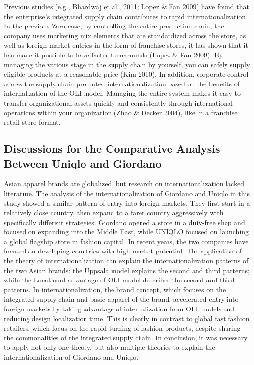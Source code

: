 \documentclass[12pt,]{article}
\begin{document}
Previous studies (e.g., Bhardwaj et al., 2011; Lopez \& Fan 2009) have
found that the enterprise's integrated supply chain contributes to rapid
internationalization. In the previous Zara case, by controlling the
entire production chain, the company uses marketing mix elements that
are standardized across the store, as well as foreign market entries in
the form of franchise stores, it has shown that it has made it possible
to have faster turnarounds (Lopez \& Fan 2009). By managing the various
stage in the supply chain by yourself, you can safely supply eligible
products at a reasonable price (Kim 2010). In addition, corporate
control across the supply chain promoted internationalization based on
the benefits of internalization of the OLI model. Managing the entire
system makes it easy to transfer organizational assets quickly and
consistently through international operations within your organization
(Zhao \& Decker 2004), like in a franchise retail store format.

\hypertarget{discussions-for-the-comparative-analysis-between-uniqlo-and-giordano}{%
\subsection{Discussions for the Comparative Analysis Between Uniqlo and
Giordano}\label{discussions-for-the-comparative-analysis-between-uniqlo-and-giordano}}

Asian apparel brands are globalized, but research on
internationalization lacked literature. The analysis of the
internationalization of Giordano and Uniqlo in this study showed a
similar pattern of entry into foreign markets. They first start in a
relatively close country, then expand to a farer country aggressively
with specifically different strategies. Giordano opened a store in a
duty-free shop and focused on expanding into the Middle East, while
UNIQLO focused on launching a global flagship store in fashion capital.
In recent years, the two companies have focused on developing countries
with high market potential. The application of the theory of
internationalization can explain the internationalization patterns of
the two Asian brands: the Uppsala model explains the second and third
patterns; while the Locational advantage of OLI model describes the
second and third patterns. In internationalization, the brand concept,
which focuses on the integrated supply chain and basic apparel of the
brand, accelerated entry into foreign markets by taking advantage of
internalization from OLI models and reducing design localization time.
This is clearly in contrast to global fast fashion retailers, which
focus on the rapid turning of fashion products, despite sharing the
commonalities of the integrated supply chain. In conclusion, it was
necessary to apply not only one theory, but also multiple theories to
explain the internationalization of Giordano and Uniqlo.
\end{document}
